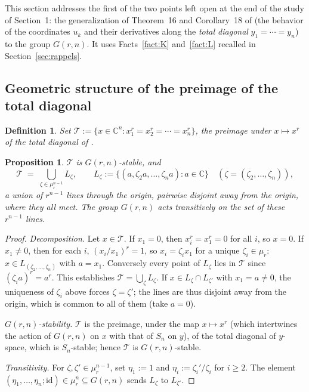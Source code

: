 \documentclass[11pt]{article}
\newtheorem{proposition}[theorem]{Proposition}
\newtheorem{definition}[theorem]{Definition}
\theoremstyle{remark}
\newcommand{\CC}{\mathbb{C}}
\begin{document}
This section addresses the first of the two points left open at the end of the study of Section~1: the generalization of Theorem~16 and Corollary~18 of \cite{Ze} (the behavior of the coordinates $u_k$ and their derivatives along the \emph{total diagonal} $y_1=\cdots=y_n$) to the group $G(r,n)$. It uses Facts~\ref{fact:K} and~\ref{fact:L} recalled in Section~\ref{sec:rappels}.

\subsection{Geometric structure of the preimage of the total diagonal}

\begin{definition}
Set $\mathcal T := \{x\in\CC^n : x_1^r=x_2^r=\cdots=x_n^r\}$, the preimage under $x\mapsto x^r$ of the total diagonal of \cite{Ze}.
\end{definition}

\begin{proposition}\label{prop:structT}
$\mathcal T$ is $G(r,n)$-stable, and
\[
\mathcal T \;=\; \bigcup_{\zeta\in\mu_r^{n-1}} L_\zeta, \qquad L_\zeta := \{(a,\zeta_2a,\dots,\zeta_na) : a\in\CC\} \quad (\zeta=(\zeta_2,\dots,\zeta_n)),
\]
a union of $r^{n-1}$ lines through the origin, pairwise disjoint away from the origin, where they all meet. The group $G(r,n)$ acts transitively on the set of these $r^{n-1}$ lines.
\end{proposition}

\begin{proof}
\emph{Decomposition.} Let $x\in\mathcal T$. If $x_1=0$, then $x_i^r=x_1^r=0$ for all $i$, so $x=0$. If $x_1\ne0$, then for each $i$, $(x_i/x_1)^r=1$, so $x_i=\zeta_ix_1$ for a unique $\zeta_i\in\mu_r$: $x\in L_{(\zeta_2,\dots,\zeta_n)}$ with $a=x_1$. Conversely every point of $L_\zeta$ lies in $\mathcal T$ since $(\zeta_ia)^r=a^r$. This establishes $\mathcal T=\bigcup_\zeta L_\zeta$. If $x\in L_\zeta\cap L_{\zeta'}$ with $x_1=a\ne0$, the uniqueness of $\zeta_i$ above forces $\zeta=\zeta'$; the lines are thus disjoint away from the origin, which is common to all of them (take $a=0$).

\emph{$G(r,n)$-stability.} $\mathcal T$ is the preimage, under the map $x\mapsto x^r$ (which intertwines the action of $G(r,n)$ on $x$ with that of $S_n$ on $y$), of the total diagonal of $y$-space, which is $S_n$-stable; hence $\mathcal T$ is $G(r,n)$-stable.

\emph{Transitivity.} For $\zeta,\zeta'\in\mu_r^{n-1}$, set $\eta_1:=1$ and $\eta_i:=\zeta_i'/\zeta_i$ for $i\ge2$. The element $(\eta_1,\dots,\eta_n;\mathrm{id})\in\mu_r^n\subseteq G(r,n)$ sends $L_\zeta$ to $L_{\zeta'}$.
\end{proof}
\end{document}
